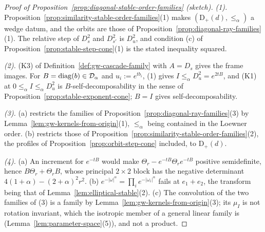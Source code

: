 \begin{proof}[Proof of Proposition~\ref{prop:diagonal-stable-order-families} (sketch)]
\emph{(1).} Proposition~\ref{prop:similarity-stable-order-families}(1) makes $(\mathrm D_+(d), \le_\alpha)$ a
wedge datum, and the orbits are those of Proposition~\ref{prop:diagonal-ray-families}(1). The relative step
of $D_s^2$ and $D_{s'}^2$ is $D_u^2$, and condition (c) of Proposition~\ref{prop:stable-step-cone}(1) is the
stated inequality squared.

\emph{(2).} (K3) of Definition~\ref{def:gw-cascade-family} with $A = D_s$ gives the frame images. For
$B = \operatorname{diag}(b) \in \mathcal D_\alpha$ and $u_i := e^{tb_i}$, (1) gives $I \le_\alpha D_u^2 = e^{2tB}$, and (K1)
at $0 \le_\alpha I \le_\alpha D_u^2$ is $B$-self-decomposability in the sense of
Proposition~\ref{prop:stable-exponent-cone}; $B = I$ gives self-decomposability.

\emph{(3).} (a) restricts the families of Proposition~\ref{prop:diagonal-ray-families}(3) by
Lemma~\ref{lem:gw-kernels-from-origin}(1), $\le_\alpha$ being contained in the Loewner order. (b) restricts
those of Proposition~\ref{prop:similarity-stable-order-families}(2), the profiles of
Proposition~\ref{prop:orbit-step-cone} included, to $\mathrm D_+(d)$.

\emph{(4).} (a) An increment for $e^{-tB}$ would make $\Theta_r - e^{-tB}\Theta_re^{-tB}$ positive
semidefinite, hence $B\Theta_r + \Theta_rB$, whose principal $2 \times 2$ block has the negative determinant
$4(1+\alpha) - (2+\alpha)^2r^2$. (b) $e^{-|\omega|^\alpha} = \prod_ie^{-|\omega_i|^\alpha}$ fails at
$e_1 + e_2$, the transform being that of Lemma~\ref{lem:elliptical-stable}(2). (c) The convolution of the
two families of (3) is a family by Lemma~\ref{lem:gw-kernels-from-origin}(3); its $\mu_I$ is not rotation
invariant, which the isotropic member of a general linear family is (Lemma~\ref{lem:parameter-space}(5)),
and not a product.
\end{proof}
